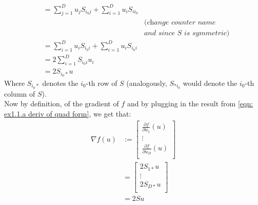 \documentclass[12pt]{article}
\begin{document}
\begin{align}
    \nonumber
     & = \sum_{j=1}^{D} u_{j} S_{i_0 j} + \sum_{i=1}^{D} u_{i} S_{i i_0}                                                                                                                                                                                                                                                 \\
    \nonumber
     &                                                                                                                                                                                                                                                                   & \textit{(change counter name}                 \\[-.1cm]
    \nonumber
     &                                                                                                                                                                                                                                                                   & \textit{and since } S \textit{ is symmetric}) \\
    \nonumber
     & = \sum_{i=1}^{D} u_{i} S_{i_0 i} + \sum_{i=1}^{D} u_{i} S_{i_0 i}                                                                                                                                                                                                                                                 \\
    \nonumber
     & = 2 \sum_{i=1}^{D} S_{i_0 i} u_i                                                                                                                                                                                                                                                                                  \\
    \label{eqn: ex1.1.a deriv of quad form}
     & = 2 S_{i_0 *} u
\end{align}
Where \(S_{i_0 *}\) denotes the \(i_0\)-th row of \(S\) (analogously, \(S_{* i_0}\) would denote the \(i_0\)-th column of \(S\)). \\
Now by definition, of the gradient of \(f\) and by plugging in the result from \eqref{eqn: ex1.1.a deriv of quad form}, we get that:
\begin{align*}
    \nabla f (u)
     & :=
    \begin{bmatrix}
        \frac{\partial f}{\partial u_{1}} (u) \\
        \vdots                                \\
        \frac{\partial f}{\partial u_{D}} (u) \\
    \end{bmatrix} \\
     & =
    \begin{bmatrix}
        2 S_{1 *} u \\
        \vdots      \\
        2 S_{D *} u \\
    \end{bmatrix} \\
     & = 2 Su
\end{align*}
\end{document}
